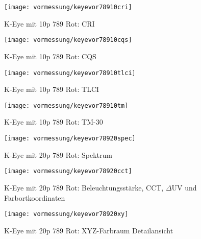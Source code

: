 \documentclass[pagesize,paper=A4,fontsize=12pt,utf8,numbers=noenddot,bibliography=totoc,listof=totoc,DIV=11,BCOR=1mm]{scrreprt}
\begin{document}
\begin{figure}[htp]     %
\centering
\texttt{[image: vormessung/keyevor78910cri]} 
\caption {K-Eye mit 10p 789 Rot: CRI} 
\end{figure}

\begin{figure}[htp]     %
\centering
\texttt{[image: vormessung/keyevor78910cqs]} 
\caption {K-Eye mit 10p 789 Rot: CQS} 
\end{figure}

\begin{figure}[htp]     %
\centering
\texttt{[image: vormessung/keyevor78910tlci]} 
\caption {K-Eye mit 10p 789 Rot: TLCI} 
\end{figure}

\begin{figure}[htp]     %
\centering
\texttt{[image: vormessung/keyevor78910tm]} 
\caption {K-Eye mit 10p 789 Rot: TM-30} 
\end{figure}




\begin{figure}[htp]     %
\centering
\texttt{[image: vormessung/keyevor78920spec]} 
\caption {K-Eye mit 20p 789 Rot: Spektrum} 
\end{figure}

\begin{figure}[htp]     %
\centering
\texttt{[image: vormessung/keyevor78920cct]} 
\caption {K-Eye mit 20p 789 Rot: Beleuchtungsstärke, CCT, $\Delta$UV und Farbortkoordinaten} 
\end{figure}

\begin{figure}[htp]     %
\centering
\texttt{[image: vormessung/keyevor78920xy]} 
\caption {K-Eye mit 20p 789 Rot: XYZ-Farbraum Detailansicht} 
\end{figure}
\end{document}
